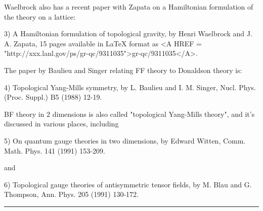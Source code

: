 Waelbrock also has a recent paper with Zapata on a Hamiltonian
formulation of the theory on a lattice:

3) A Hamiltonian formulation of topological gravity, by Henri Waelbrock
and J. A. Zapata, 15 pages available in LaTeX format as <A HREF = "http://xxx.lanl.gov/ps/gr-qc/9311035">gr-qc/9311035</A>.  

The paper by Baulieu and Singer relating FF theory to Donaldson theory
is: 

4) Topological Yang-Mills symmetry, by L. Baulieu and I. M. Singer, 
Nucl. Phys. (Proc. Suppl.) B5 (1988) 12-19.  

BF theory in 2 dimensions is also called "topological Yang-Mills
theory", and it's discussed in various places, including 

5) On quantum gauge theories in two dimensions, by Edward Witten, Comm.
Math. Phys. 141 (1991) 153-209.

and

6) Topological gauge theories of antisymmetric tensor fields,
by M. Blau and G. Thompson, Ann. Phys. 205 (1991) 130-172.
\par\noindent\rule{\textwidth}{0.4pt}

